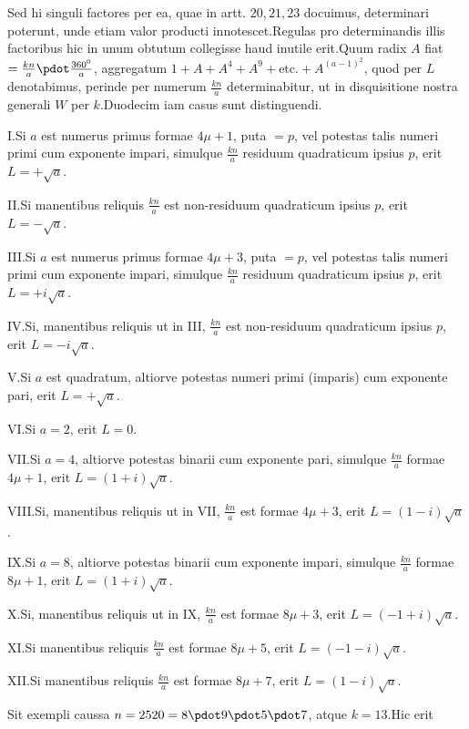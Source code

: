 Sed hi singuli factores per ea, quae in artt. $20,21,23$ docuimus, determinari poterunt, unde etiam valor producti innotescet.\quad Regulas pro determinandis illis factoribus hic in unum obtutum collegisse haud inutile erit.\quad Quum radix $A$ fiat $=\frac{kn}{a}\pdot\frac{360^0}{a}$, aggregatum $1+A+A^4+A^9+\text{etc.}+A^{(a-1)^2}$, quod per $L$ denotabimus, perinde per numerum $\frac{kn}{a}$ determinabitur, ut in disquisitione nostra generali $W$ per $k$.\quad Duodecim iam casus sunt distinguendi.

I.\quad Si $a$ est numerus primus formae $4\mu+1$, puta $=p$, vel potestas talis numeri primi cum exponente impari, simulque $\frac{kn}{a}$ residuum quadraticum ipsius $p$, erit $L=+\surd a$.

II.\quad Si manentibus reliquis $\frac{kn}{a}$ est non-residuum quadraticum ipsius $p$, erit $L=-\surd a$.

III.\quad Si $a$ est numerus primus formae $4\mu+3$, puta $=p$, vel potestas talis numeri primi cum exponente impari, simulque $\frac{kn}{a}$ residuum quadraticum ipsius $p$, erit $L=+i\surd a$.

IV.\quad Si, manentibus reliquis ut in III, $\frac{kn}{a}$ est non-residuum quadraticum ipsius $p$, erit $L=-i\surd a$.

V.\quad Si $a$ est quadratum, altiorve potestas numeri primi (imparis) cum exponente pari, erit $L=+\surd a$.

VI.\quad Si $a=2$, erit $L=0$.

VII.\quad Si $a=4$, altiorve potestas binarii cum exponente pari, simulque $\frac{kn}{a}$ formae $4\mu+1$, erit $L=(1+i)\surd a$.

VIII.\quad Si, manentibus reliquis ut in VII, $\frac{kn}{a}$ est formae $4\mu+3$, erit $L=(1-i)\surd a$.

IX.\quad Si $a=8$, altiorve potestas binarii cum exponente impari, simulque $\frac{kn}{a}$ formae $8\mu+1$, erit $L=(1+i)\surd a$.


X.\quad Si, manentibus reliquis ut in IX, $\frac{kn}{a}$ est formae $8\mu+3$, erit $L=(-1+i)\surd a$.

XI.\quad Si manentibus reliquis $\frac{kn}{a}$ est formae $8\mu+5$, erit $L=(-1-i)\surd a$.

XII.\quad Si manentibus reliquis $\frac{kn}{a}$ est formae $8\mu+7$, erit $L=(1-i)\surd a$.


Sit exempli caussa $n=2520=8\pdot9\pdot5\pdot7$, atque $k=13$.\quad Hic erit

